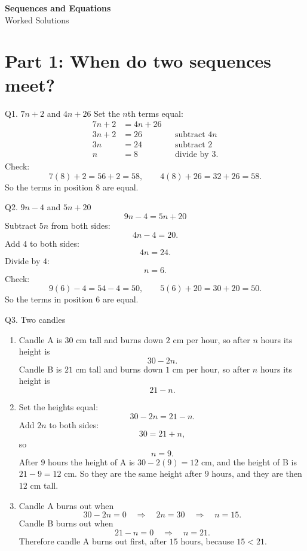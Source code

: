 \documentclass[11pt,a4paper]{article}
\begin{document}
\begin{center}
  {\LARGE\bfseries Sequences and Equations}\\[2pt]
  {\large Worked Solutions}
\end{center}

\section*{Part 1: When do two sequences meet?}

\begin{solbox}{Q1. \(7n+2\) and \(4n+26\)}
Set the \(n\)th terms equal:
\begin{align*}
7n+2&=4n+26\\
3n+2&=26 &&\text{subtract }4n\\
3n&=24 &&\text{subtract }2\\
n&=8 &&\text{divide by }3.
\end{align*}
Check:
\[
7(8)+2=56+2=58,\qquad 4(8)+26=32+26=58.
\]
So the terms in position \(\boxed{8}\) are equal.
\end{solbox}

\begin{solbox}{Q2. \(9n-4\) and \(5n+20\)}
\[
9n-4=5n+20
\]
Subtract \(5n\) from both sides:
\[
4n-4=20.
\]
Add \(4\) to both sides:
\[
4n=24.
\]
Divide by \(4\):
\[
n=6.
\]
Check:
\[
9(6)-4=54-4=50,\qquad 5(6)+20=30+20=50.
\]
So the terms in position \(\boxed{6}\) are equal.
\end{solbox}

\begin{solbox}{Q3. Two candles}
\begin{enumerate}[label=(\alph*)]
\item Candle A is \(30\) cm tall and burns down \(2\) cm per hour, so after \(n\) hours its height is
\[
30-2n.
\]
Candle B is \(21\) cm tall and burns down \(1\) cm per hour, so after \(n\) hours its height is
\[
21-n.
\]
\item Set the heights equal:
\[
30-2n=21-n.
\]
Add \(2n\) to both sides:
\[
30=21+n,
\]
so
\[
n=9.
\]
After \(9\) hours the height of A is \(30-2(9)=12\) cm, and the height of B is \(21-9=12\) cm. So they are the same height after \(\boxed{9\text{ hours}}\), and they are then \(\boxed{12\text{ cm}}\) tall.

\item Candle A burns out when
\[
30-2n=0 \quad\Rightarrow\quad 2n=30 \quad\Rightarrow\quad n=15.
\]
Candle B burns out when
\[
21-n=0 \quad\Rightarrow\quad n=21.
\]
Therefore candle A burns out first, after \(15\) hours, because \(15<21\).
\end{enumerate}
\end{solbox}
\end{document}
